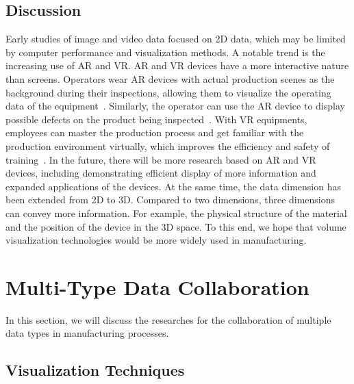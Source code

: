 \documentclass[a4paper,fleqn]{cas-dc}
\begin{document}
\subsection{Discussion}
Early studies of image and video data focused on 2D data, which may be limited by computer performance and visualization methods. A notable trend is the increasing use of AR and VR. 
AR and VR devices have a more interactive nature than screens. Operators wear AR devices with actual production scenes as the background during their inspections, allowing them to visualize the operating data of the equipment~\cite{Satkowski2021}. Similarly, the operator can use the AR device to display possible defects on the product being inspected~\cite{Murithi2020}. With VR equipments, employees can master the production process and get familiar with the production environment virtually, which improves the efficiency and safety of training~\cite{hamid2014virtual}. In the future, there will be more research based on AR and VR devices, including demonstrating efficient display of more information and expanded applications of the devices.
At the same time, the data dimension has been extended from 2D to 3D. Compared to two dimensions, three dimensions can convey more information. For example, the physical structure of the material and the position of the device in the 3D space. To this end, we hope that volume visualization technologies would be more widely used in manufacturing.

\section{Multi-Type Data Collaboration}
In this section, we will discuss the researches for the collaboration of multiple data types in manufacturing processes.
\subsection{Visualization Techniques}
%
\end{document}
